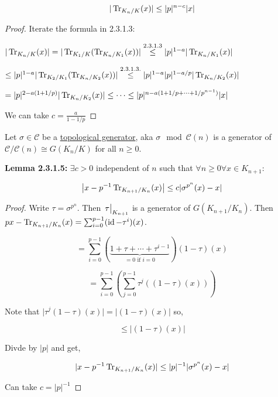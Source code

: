 \documentclass{article}
\theoremstyle{definition}
\numberwithin{theorem}{subsection}
\begin{document}
    \[
        \vert \Tr_{K_n / K}(x) \vert \leq \vert p \vert^{n-c} \vert x \vert
    \]

    \begin{proof}
        Iterate the formula in 2.3.1.3:

        \(\vert \Tr_{K_n / K} (x) \vert = \vert \Tr_{K_1 / K} (\Tr_{K_n / K_1}(x)) \vert \overset{2.3.1.3}{\leq} \vert p \vert^{1-a} \vert \Tr_{K_n / K_1}(x) \vert\)
        
        \(\leq \vert p \vert^{1-a} \vert \Tr_{K_2 / K_1}(\Tr_{K_n / K_2}(x)) \vert \overset{2.3.1.3.}{\leq} \vert p \vert^{1-a} \vert p \vert^{1-a / p} \vert \Tr_{K_n / K_2}(x) \vert  \) 

        \(= \vert p \vert^{2 - a (1+1 / p)} \vert \Tr_{K_n / K_2}(x) \vert \leq  \cdots \leq \vert p \vert ^{n - a(1 + 1 / p + \cdots + 1 / p^{n-1})} \vert x \vert\) 

        We can take \(c = \frac{a}{1 - 1 / p}\) 
    \end{proof}

    Let \(\sigma \in \mathscr{C}\) be a \underline{topological generator}, aka \(\sigma \mod \mathscr{C}(n)\) is a generator of \(\mathscr{C} / \mathscr{C} (n) \cong G(K_n / K)\) for all \(n \geq 0\). 

    \textbf{Lemma 2.3.1.5:} \(\exists c > 0\) independent of \(n\) such that \(\forall n\geq 0 \forall x\in K_{n+1}:\)

    \[
        \left\vert x - p ^{-1} \Tr_{K_{n+1} / K_n}(x) \right\vert \leq c \vert \sigma^{p^{n}}(x) - x \vert 
    \]

    \begin{proof}
        Write \(\tau  = \sigma^{p^n}\). Then \(\eval{\tau}_{K_{n+1}}\) is a generator of \(G(K_{n+1} / K_n)\). Then \(px - \Tr_{K_{n+1} / K_n}(x) = \sum_{i=0}^{p-1} (\operatorname{id} - \tau^i)(x)\). 

        \[
            = \sum_{i=0}^{p-1} (\underbrace{1 + \tau  + \cdots + \tau^{i-1}}_{=0 \text{ if } i = 0}) (1-\tau) (x)
        \]

        \[
            = \sum_{i=0}^{p-1} \left( \sum_{j=0}^{p-1} \tau^j ((1-\tau)(x)) \right) 
        \]

        Note that \(\vert \tau^j(1-\tau)(x) \vert = \vert (1-\tau)(x) \vert\) so, 
        
        \[
            \leq \vert (1-\tau)(x) \vert
        \]

        Divde by \(\vert p \vert\) and get,

        \[
            \vert x - p ^{-1} \Tr_{K_{n+1} / K_n}(x) \vert \leq \vert p \vert ^{-1} \vert \sigma^{p^n}(x) - x \vert  
        \]

        Can take \(c = \vert p \vert ^{-1}\) 
    \end{proof}
\end{document}
